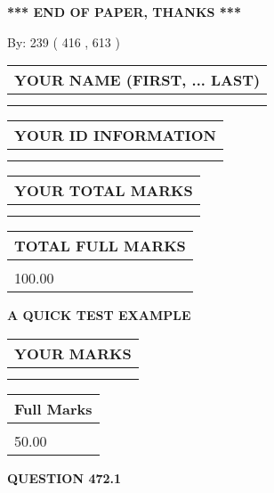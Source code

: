 \documentclass[12pt]{article}
\begin{document}
\vspace{1.0in} 
{\textbf{\large{ *** END OF PAPER, THANKS *** }}} 
   
   
\hspace{1.0in} By: 
 239 ( 416 ,  613 )
   
   
   
   
\newpage 
\setcounter{page}{ 
   472001 } 
   
   
   
   
\noindent\begin{tabular}{|l|}
\hline
YOUR NAME (FIRST, ... LAST)  \\
\hline
 \\ 
 \\ 
\hline
\end{tabular}
\hspace{0.05in} \begin{tabular}{|l|}
\hline
 YOUR   ID   INFORMATION  \\
\hline
 \\ 
 \\ 
\hline
\end{tabular}
   
   
\vspace{0.2in}\noindent\begin{tabular}{|l|}
\hline
YOUR TOTAL MARKS  \\
\hline
 \\ 
 \\ 
\hline
\end{tabular}
\hspace{0.05in} \begin{tabular}{|l|}
\hline
TOTAL FULL MARKS  \\
\hline
 \\ 
100.00 \\
\hline
\end{tabular}
   
   
 \vspace{0.2in}
{\LARGE {\textbf{ A QUICK TEST EXAMPLE}}}
   
   
  
\vspace{0.2in}
  
\noindent\begin{tabular}{|l|}
\hline
 YOUR MARKS  \\
\hline
 \\ 
 \\ 
\hline
\end{tabular}
\hspace{0.05in} \begin{tabular}{|l|}
\hline
 Full Marks  \\
\hline
 \\ 
50.00 \\
\hline
\end{tabular}
{\textbf{\Large{QUESTION
472.1 
}}}
  
\end{document}
